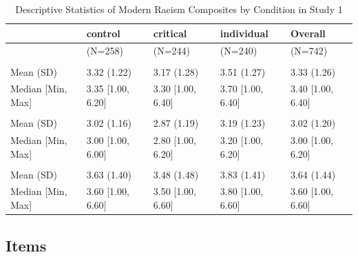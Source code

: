 \documentclass[
]{book}
\begin{document}
\begin{table}

\caption{\label{tab:sr-table-s1}Descriptive Statistics of Modern Racism Composites by Condition in Study 1}
\centering
\begin{tabular}[t]{lllll}
\toprule
  & control & critical & individual & Overall\\
\midrule
 & (N=258) & (N=244) & (N=240) & (N=742)\\
\addlinespace[0.3em]
\multicolumn{5}{l}{\textbf{Modern Racism}}\\
\hspace{1em}Mean (SD) & 3.32 (1.22) & 3.17 (1.28) & 3.51 (1.27) & 3.33 (1.26)\\
\hspace{1em}Median [Min, Max] & 3.35 [1.00, 6.20] & 3.30 [1.00, 6.40] & 3.70 [1.00, 6.40] & 3.40 [1.00, 6.40]\\
\addlinespace[0.3em]
\multicolumn{5}{l}{\textbf{External Modern Racism}}\\
\hspace{1em}Mean (SD) & 3.02 (1.16) & 2.87 (1.19) & 3.19 (1.23) & 3.02 (1.20)\\
\hspace{1em}Median [Min, Max] & 3.00 [1.00, 6.00] & 2.80 [1.00, 6.20] & 3.20 [1.00, 6.20] & 3.00 [1.00, 6.20]\\
\addlinespace[0.3em]
\multicolumn{5}{l}{\textbf{Internal Modern Racism}}\\
\hspace{1em}Mean (SD) & 3.63 (1.40) & 3.48 (1.48) & 3.83 (1.41) & 3.64 (1.44)\\
\hspace{1em}Median [Min, Max] & 3.60 [1.00, 6.60] & 3.50 [1.00, 6.60] & 3.80 [1.00, 6.60] & 3.60 [1.00, 6.60]\\
\bottomrule
\end{tabular}
\end{table}

\hypertarget{items}{%
\subsection{Items}\label{items}}
\end{document}
